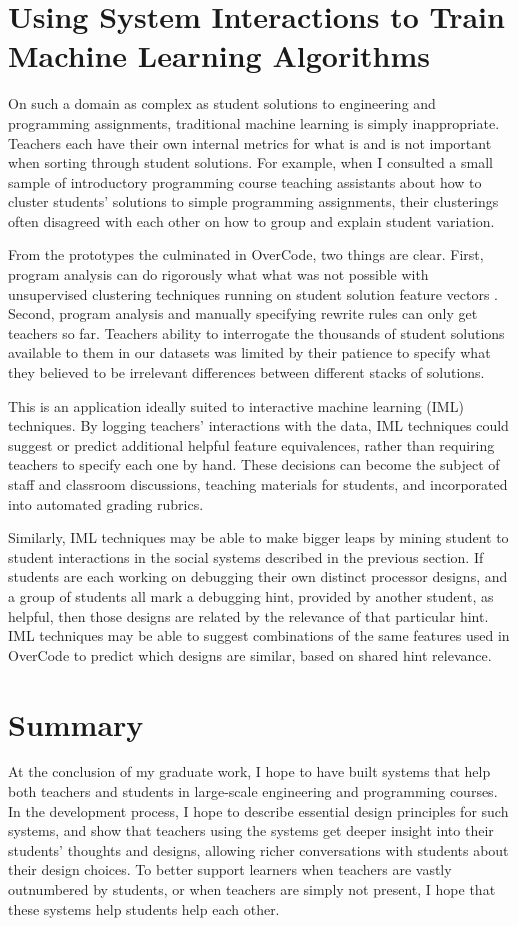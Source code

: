 \documentclass{sigchi}
\begin{document}
\section{Using System Interactions to Train Machine Learning Algorithms}

On such a domain as complex as student solutions to engineering and programming assignments, traditional machine learning is simply inappropriate. Teachers each have their own internal metrics for what is and is not important when sorting through student solutions. For example, when I consulted a small sample of introductory programming course teaching assistants about how to cluster students' solutions to simple programming assignments, their clusterings often disagreed with each other on how to group and explain student variation.

From the prototypes the culminated in OverCode, two things are clear. First, program analysis can do rigorously what what was not possible with unsupervised clustering techniques running on student solution feature vectors \cite{GlassmanCHIWkshop}. Second, program analysis and manually specifying rewrite rules can only get teachers so far. Teachers ability to interrogate the thousands of student solutions available to them in our datasets was limited by their patience to specify what they believed to be irrelevant differences between different stacks of solutions. 

This is an application ideally suited to interactive machine learning (IML) techniques. By logging teachers' interactions with the data, IML techniques could suggest or predict additional helpful feature equivalences, rather than requiring teachers to specify each one by hand. These decisions can become the subject of staff and classroom discussions, teaching materials for students, and incorporated into automated grading rubrics. 

Similarly, IML techniques may be able to make bigger leaps by mining student to student interactions in the social systems described in the previous section. If students are each working on debugging their own distinct processor designs, and a group of students all mark a debugging hint, provided by another student, as helpful, then those designs are related by the relevance of that particular hint. IML techniques may be able to suggest combinations of the same features used in OverCode to predict which designs are similar, based on shared hint relevance.

\section{Summary}
At the conclusion of my graduate work, I hope to have built systems that help both teachers and students in large-scale engineering and programming courses. In the development process, I hope to describe essential design principles for such systems, and show that teachers using the systems get deeper insight into their students' thoughts and designs, allowing richer conversations with students about their design choices. To better support learners when teachers are vastly outnumbered by students, or when teachers are simply not present, I hope that these systems help students help each other.
\end{document}

